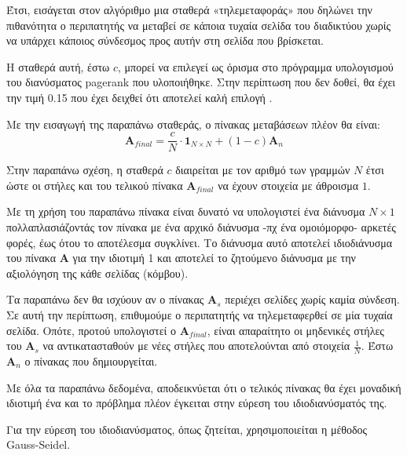 Έτσι, εισάγεται στον αλγόριθμο μια σταθερά «τηλεμεταφοράς» που δηλώνει την πιθανότητα ο περιπατητής να μεταβεί σε κάποια τυχαία σελίδα του διαδικτύου χωρίς να υπάρχει κάποιος σύνδεσμος προς αυτήν στη σελίδα που βρίσκεται.

Η σταθερά αυτή, έστω $c$, μπορεί να επιλεγεί ως όρισμα στο πρόγραμμα υπολογισμού του διανύσματος pagerank που υλοποιήθηκε. Στην περίπτωση που δεν δοθεί, θα έχει την τιμή 0.15 που έχει δειχθεί ότι αποτελεί καλή επιλογή \parencite{brin1998anatomy}.

Με την εισαγωγή της παραπάνω σταθεράς, ο πίνακας μεταβάσεων πλέον θα είναι:
\[
  \bm{A}_{final} = \frac{c}{N}\cdot\bm{1}_{N\times N}+(1-c)\bm{A}_n
\]

Στην παραπάνω σχέση, η σταθερά $c$ διαιρείται με τον αριθμό των γραμμών $N$ έτσι ώστε οι στήλες και του τελικού πίνακα $\bm{A}_{final}$ να έχουν στοιχεία με άθροισμα $1$.

Με τη χρήση του παραπάνω πίνακα είναι δυνατό να υπολογιστεί ένα διάνυσμα $N\times1$ πολλαπλασιάζοντάς τον πίνακα με ένα αρχικό διάνυσμα -πχ ένα ομοιόμορφο- αρκετές φορές, έως ότου το αποτέλεσμα συγκλίνει. Το διάνυσμα αυτό αποτελεί ιδιοδιάνυσμα του πίνακα $\bm{A}$ για την ιδιοτιμή 1 και αποτελεί το ζητούμενο διάνυσμα με την αξιολόγηση της κάθε σελίδας (κόμβου).

Τα παραπάνω δεν θα ισχύουν αν ο πίνακας $\bm{A}_s$ περιέχει σελίδες χωρίς καμία σύνδεση. Σε αυτή την περίπτωση, επιθυμούμε ο περιπατητής να τηλεμεταφερθεί σε μία τυχαία σελίδα. Οπότε, προτού υπολογιστεί ο $\bm{A}_{final}$, είναι απαραίτητο οι μηδενικές στήλες του $\bm{A}_s$ να αντικατασταθούν με νέες στήλες που αποτελούνται από στοιχεία $\frac{1}{N}$. Έστω $\bm{A}_n$ ο πίνακας που δημιουργείται.

Με όλα τα παραπάνω δεδομένα, αποδεικνύεται ότι ο τελικός πίνακας θα έχει μοναδική ιδιοτιμή ένα και το πρόβλημα πλέον έγκειται στην εύρεση του ιδιοδιανύσματός της.

Για την εύρεση του ιδιοδιανύσματος, όπως ζητείται, χρησιμοποιείται η μέθοδος Gauss-Seidel.

